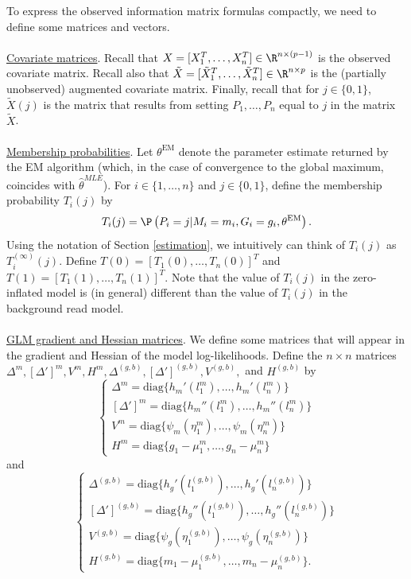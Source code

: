 \documentclass[12pt]{article}
\begin{document}
To express the observed information matrix formulas compactly, we need to define some matrices and vectors.
\noindent \\ \\
\underline{Covariate matrices}. Recall that $X = [ X_1^T, \dots, X^T_n] \in \R^{n \times (p-1)}$ is the observed covariate matrix. Recall also that $\tilde{X} = [\tilde{X}_1^T, \dots, \tilde{X}_n^T] \in \R^{n \times p}$ is the (partially unobserved) augmented covariate matrix. Finally, recall that for $j \in \{ 0, 1\}$, $\tilde{X}(j)$ is the matrix that results from setting $P_1, \dots, P_n$ equal to $j$ in the matrix $\tilde{X}$. 
\noindent \\ \\
\underline{Membership probabilities}. Let $\theta^{\textrm{EM}}$ denote the parameter estimate returned by the EM algorithm (which, in the case of convergence to the global maximum, coincides with $\hat{\theta}^{MLE}$). For $i \in \{1, \dots, n\}$ and $j \in \{0,1\}$, define the membership probability $T_i(j)$ by $$T_i(j) = \P\left( P_i = j | M_i = m_i, G_i = g_i, \theta^\textrm{EM} \right).$$ Using the notation of Section \ref{estimation}, we intuitively can think of $T_i(j)$ as $T^{(\infty)}_i(j).$ Define $T(0) = [T_1(0), \dots, T_n(0)]^T$ and $T(1) = [T_1(1), \dots, T_n(1)]^T.$ Note that the value of $T_i(j)$ in the zero-inflated model is (in general) different than the value of $T_i(j)$ in the background read model.
\noindent \\ \\
\underline{GLM gradient and Hessian matrices}. We define some matrices that will appear in the gradient and Hessian of the model log-likelihoods. Define the $n \times n$ matrices $\Delta^m, [\Delta']^m, V^m, H^m, \Delta^{(g,b)} , [\Delta']^{(g,b)} , V^{(g,b)} ,$ and $H^{(g,b)} $ by
$$
\begin{cases}
\Delta^m = \textrm{diag} \{ h_m'(l_1^m), \dots, h_m'( l_n^m ) \} \\
[\Delta']^m = \textrm{diag} \{ h_m''(l_1^m), \dots, h_m''( l_n^m) \} \\
V^m = \textrm{diag} \{ \psi_m( \eta^m_1), \dots, \psi_m( \eta^m_n) \} \\
H^m = \textrm{diag} \{ g_1 - \mu_1^m, \dots, g_n - \mu_n^m \}
\end{cases}
$$
and 
$$ \begin{cases}
\Delta^{(g,b)} = \textrm{diag} \{ h_g'(l_1^{(g,b)} ), \dots, h_g'( l_n^{(g,b)}) \} \\
[\Delta']^{(g,b)}  = \textrm{diag} \{ h_g''(l_1^{(g,b)} ), \dots, h_g''( l_n^{(g,b)} ) \} \\
V^{(g,b)}  = \textrm{diag} \{ \psi_g( \eta^{(g,b)} _1), \dots, \psi_g( \eta^{(g,b)} _n) \} \\
H^{(g,b)}  = \textrm{diag} \{ m_1 - \mu_1^{(g,b)} , \dots, m_n - \mu_n^{(g,b)}  \} .
\end{cases}
$$
\end{document}
